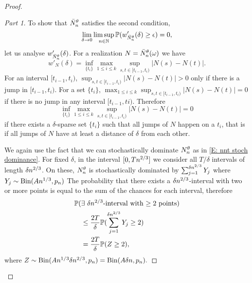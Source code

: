 \begin{proof}
\begin{proof}[Part 1]
\bigskip

To show that $\bar{N}_n^{\theta}$ satisfies the second condition,
\begin{equation} \label{E: tightness cond 2}
\lim_{\delta \rightarrow 0} \limsup_{n \in \mathbb{N}}\mathbb{P}(w'_{\bar{N}_n^{\theta}}(\delta) \geq \epsilon ) = 0,
\end{equation}
let us analyse $w'_{\bar{N}_n^{\theta}}(\delta)$.
For a realization $N = \bar{N}_n^{\theta}(\omega)$ we have
\begin{equation}
w'_{N}(\delta) = \inf_{\{t_i\}} \max_{1\leq i \leq k} \sup_{s,t \in [t_{i-1}, t_i)} |N(s) - N(t)|.
\end{equation}
For an interval $[t_{i-1}, t_i)$, 
$\sup_{s,t \in [t_{i-1}, t_i)} |N(s) - N(t)| > 0$ only if there is a jump in $[t_{i-1}, t_i)$.
For a set $\{t_i\}$, $\max_{1\leq i \leq k} \sup_{s,t \in [t_{i-1}, t_i)} |N(s) - N(t)| = 0$ if there is no jump in any interval $[t_{i-1}, ti)$.
Therefore
\begin{equation}
\inf_{\{t_i\}} \max_{1\leq i \leq k} \sup_{s,t \in [t_{i-1}, t_i)} |N(s) - N(t)| = 0
\end{equation}
if there exists a $\delta$-sparse set $\{t_i\}$ such that all jumps of $N$ happen on a $t_i$,
that is if all jumps of $N$ have at least a distance of $\delta$ from each other.

We again use the fact that we can stochastically dominate $N_n^{\theta}$ as in \eqref{E: nnt stoch dominance}.
For fixed $\delta$, in the interval $[0, Tn^{2 / 3}]$ we consider all $T/\delta$ intervals of length $\delta n^{2 / 3}$.
On these, $N_n^{\theta}$ is stochastically dominated by $\sum_{j = 1}^{\delta n^{2 / 3}} Y_j$ where $Y_j \sim \operatorname*{Bin}(An^{1 / 3}, p_n)$
The probability that there exists a $\delta n^{2 / 3}$-interval with two or more points is equal to the sum of the chances for each interval,
therefore
\begin{equation}
\begin{aligned}
&\mathbb{P}( \text{$\exists$ $\delta n^{2 / 3}$-interval with $\geq 2$ points} ) \\
&\quad\leq \frac{2T}{\delta} \mathbb{P}( \sum_{j = 1}^{\delta n^{2 / 3}} Y_j \geq 2 ) \\
&\quad=  \frac{2T}{\delta} \mathbb{P}( Z \geq 2 ),
\end{aligned}
\end{equation}
where $Z \sim \operatorname*{Bin}(An^{1 / 3}\delta n^{2 / 3}, p_n) = \operatorname*{Bin}(A\delta n, p_n).$


\end{proof}
\end{proof}
